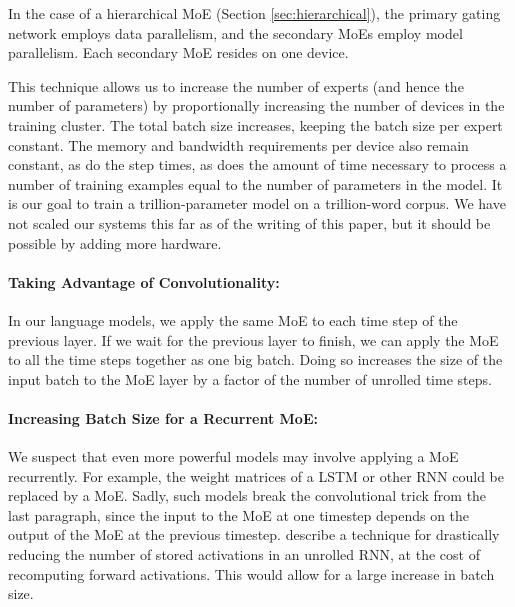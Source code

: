 \documentclass{article} \pdfoutput=1
\begin{document}
In the case of a hierarchical MoE (Section \ref{sec:hierarchical}), the primary gating network employs data parallelism, and the secondary MoEs employ model parallelism.  Each secondary MoE resides on one device.

This technique allows us to increase the number of experts (and hence the number of parameters) by proportionally increasing the number of devices in the training cluster.   The total batch size increases, keeping the batch size per expert constant.   The memory and bandwidth requirements per device also remain constant, as do the step times, as does the amount of time necessary to process a number of training examples equal to the number of parameters in the model.  It is our goal to train a trillion-parameter model on a trillion-word corpus.  We have not scaled our systems this far as of the writing of this paper, but it should be possible by adding more hardware.

\paragraph{Taking Advantage of Convolutionality:} In our language models, we apply the same MoE to each time step of the previous layer. If we wait for the previous layer to finish, we can apply the MoE to all the time steps together as one big batch.  Doing so increases the size of the input batch to the MoE layer by a factor of the number of unrolled time steps.

\paragraph{Increasing Batch Size for a Recurrent MoE:}  We suspect that even more powerful models may involve applying a MoE recurrently.  For example, the weight matrices of a LSTM or other RNN could be replaced by a MoE.   Sadly, such models break the convolutional trick from the last paragraph, since the input to the MoE at one timestep depends on the output of the MoE at the previous timestep.  \cite{Gruslys16} describe a technique for drastically reducing the number of stored activations in an unrolled RNN, at the cost of recomputing forward activations.   This would allow for a large increase in batch size.
\end{document}
